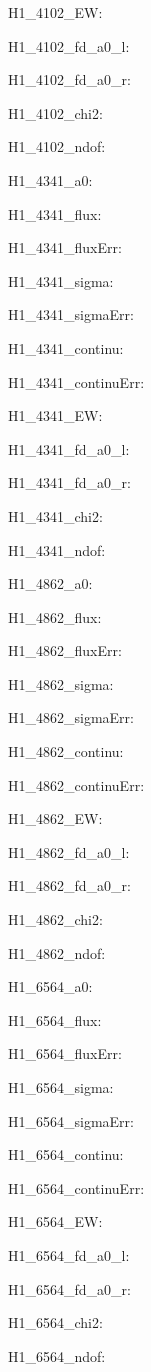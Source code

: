 \item H1\_4102\_EW: 
\item H1\_4102\_fd\_a0\_l: 
\item H1\_4102\_fd\_a0\_r: 
\item H1\_4102\_chi2: 
\item H1\_4102\_ndof: 
\item H1\_4341\_a0: 
\item H1\_4341\_flux: 
\item H1\_4341\_fluxErr: 
\item H1\_4341\_sigma: 
\item H1\_4341\_sigmaErr: 
\item H1\_4341\_continu: 
\item H1\_4341\_continuErr: 
\item H1\_4341\_EW: 
\item H1\_4341\_fd\_a0\_l: 
\item H1\_4341\_fd\_a0\_r: 
\item H1\_4341\_chi2: 
\item H1\_4341\_ndof: 
\item H1\_4862\_a0: 
\item H1\_4862\_flux: 
\item H1\_4862\_fluxErr: 
\item H1\_4862\_sigma: 
\item H1\_4862\_sigmaErr: 
\item H1\_4862\_continu: 
\item H1\_4862\_continuErr: 
\item H1\_4862\_EW: 
\item H1\_4862\_fd\_a0\_l: 
\item H1\_4862\_fd\_a0\_r: 
\item H1\_4862\_chi2: 
\item H1\_4862\_ndof: 
\item H1\_6564\_a0: 
\item H1\_6564\_flux: 
\item H1\_6564\_fluxErr: 
\item H1\_6564\_sigma: 
\item H1\_6564\_sigmaErr: 
\item H1\_6564\_continu: 
\item H1\_6564\_continuErr: 
\item H1\_6564\_EW: 
\item H1\_6564\_fd\_a0\_l: 
\item H1\_6564\_fd\_a0\_r: 
\item H1\_6564\_chi2: 
\item H1\_6564\_ndof: 
